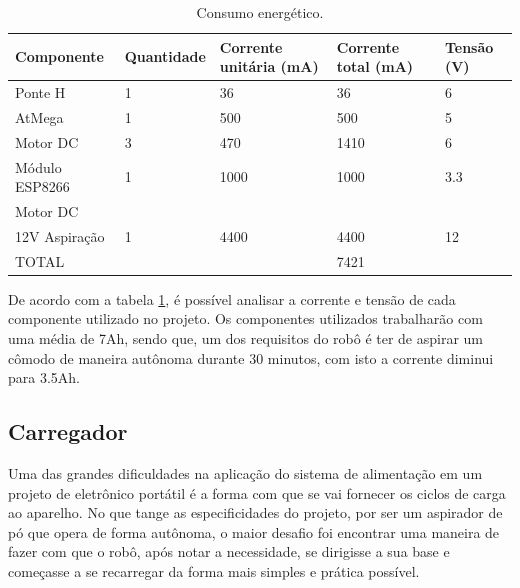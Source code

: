 		\begin{table}[H]
		\centering
		\caption{Consumo energético.}
		\label{tab:consumo_energético}
		\begin{tabular}{lllll}
		Componente               & Quantidade & Corrente unitária (mA) & Corrente total (mA) & Tensão (V) \\ \hline
		Ponte H                & 1          & 36                     & 36                  & 6          \\ \hline
		AtMega                 & 1          & 500                    & 500                 & 5          \\ \hline
		Motor DC               & 3          & 470                    & 1410                & 6          \\ \hline
		Módulo ESP8266         & 1          & 1000                   & 1000                & 3.3        \\ \hline
		Motor DC \\ 12V Aspiração & 1           & 4400                   & 4400                & 12         \\ \hline
		TOTAL                  &            &                        & 7421                & \\ \hline          
		\end{tabular}
		\end{table}

		De acordo com a tabela \ref{tab:consumo_energético}, é possível analisar a corrente e tensão de cada componente utilizado no projeto. Os componentes utilizados trabalharão com uma média de 7Ah, sendo que, um dos requisitos do robô é ter de aspirar um cômodo de maneira autônoma durante 30 minutos, com isto a corrente diminui para 3.5Ah.



	\subsection{Carregador} %
	\label{sub:carregador}
	
		Uma das grandes dificuldades na aplicação do sistema de alimentação em um projeto de eletrônico portátil é a forma com que se vai fornecer os ciclos de carga ao aparelho. No que tange as especificidades do projeto, por ser um aspirador de pó que opera de forma autônoma, o maior desafio foi encontrar uma maneira de fazer com que o robô, após notar a necessidade, se dirigisse a sua base e começasse a se recarregar da forma mais simples e prática possível. 

